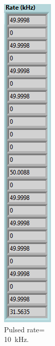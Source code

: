 \begin{figure}[H]
\begin{minipage}{0.24\textwidth}
		\caption{Pulsed rate=\\10~kHz.}
		\label{fig:10khz}
	\end{minipage}
	\begin{minipage}{0.24\textwidth}
		\centering
		\includegraphics[width=.7\linewidth]{IMG/ch5/latch_tests/fig17}

\end{minipage}
\end{figure}
